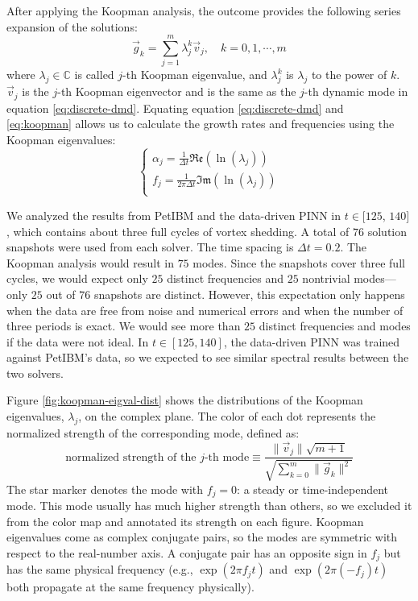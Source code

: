 After applying the Koopman analysis, the outcome provides the following series expansion of the solutions:
\begin{equation}\label{eq:koopman}
    \vec{g}_k
    =
    \sum\limits_{j=1}^{m}
    \lambda_j^k \vec{v}_j
    ,\quad
    k = 0, 1, \cdots, m
\end{equation}
where $\lambda_j \in \mathbb{C}$ is called $j$-th Koopman eigenvalue, and $\lambda_j^k$ is $\lambda_j$ to the power of $k$.
$\vec{v}_j$ is the $j$-th Koopman eigenvector and is the same as the $j$-th dynamic mode in equation \eqref{eq:discrete-dmd}.
Equating equation \eqref{eq:discrete-dmd} and \eqref{eq:koopman} allows us to calculate the growth rates and frequencies using the Koopman eigenvalues:
\begin{equation}
    \left\{
        \begin{array}{l}
            \alpha_j = \frac{1}{\Delta t} \mathfrak{Re}\left(\ln\left(\lambda_j\right)\right) \\
            f_j = \frac{1}{2\pi\Delta t} \mathfrak{Im}\left(\ln\left(\lambda_j\right)\right) \\
        \end{array}
    \right.
\end{equation} 

We analyzed the results from PetIBM and the data-driven PINN in $t\in$$[125$, $140]$, which contains about three full cycles of vortex shedding.
A total of $76$ solution snapshots were used from each solver.
The time spacing is $\Delta t = 0.2$.
The Koopman analysis would result in $75$ modes.
Since the snapshots cover three full cycles, we would expect only $25$ distinct frequencies and $25$ nontrivial modes---only $25$ out of $76$ snapshots are distinct.
However, this expectation only happens when the data are free from noise and numerical errors and when the number of three periods is exact.
We would see more than $25$ distinct frequencies and modes if the data were not ideal.
In $t \in [125, 140]$, the data-driven PINN was trained against PetIBM's data, so we expected to see similar spectral results between the two solvers.

Figure \ref{fig:koopman-eigval-dist} shows the distributions of the Koopman eigenvalues, $\lambda_j$, on the complex plane.
The color of each dot represents the normalized strength of the corresponding mode, defined as:
\begin{equation}
    \text{normalized strength of the }j\text{-th mode}
    \equiv
    \frac{\lVert \vec{v}_j \rVert \sqrt{m+1}}{\sqrt{\sum\limits_{k=0}^{m}\lVert\vec{g}_k\rVert^2}}
\end{equation}
The star marker denotes the mode with $f_j=0$: a steady or time-independent mode.
This mode usually has much higher strength than others, so we excluded it from the color map and annotated its strength on each figure.
Koopman eigenvalues come as complex conjugate pairs, so the modes are symmetric with respect to the real-number axis. 
A conjugate pair has an opposite sign in $f_j$ but has the same physical frequency (e.g., $\exp(2\pi f_jt)$ and $\exp(2\pi (-f_j)t)$ both propagate at the same frequency physically).

